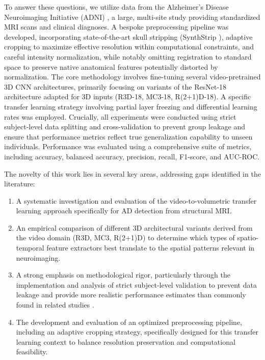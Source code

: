 \documentclass[11pt, a4paper]{article}
\begin{document}
To answer these questions, we utilize data from the Alzheimer's Disease Neuroimaging Initiative (ADNI) \cite{jack2008alzheimer}, a large, multi-site study providing standardized MRI scans and clinical diagnoses. A bespoke preprocessing pipeline was developed, incorporating state-of-the-art skull stripping (SynthStrip \cite{hoopes2022synthstrip}), adaptive cropping to maximize effective resolution within computational constraints, and careful intensity normalization, while notably omitting registration to standard space to preserve native anatomical features potentially distorted by normalization. The core methodology involves fine-tuning several video-pretrained 3D CNN architectures, primarily focusing on variants of the ResNet-18 architecture adapted for 3D inputs (R3D-18, MC3-18, R(2+1)D-18). A specific transfer learning strategy involving partial layer freezing and differential learning rates was employed. Crucially, all experiments were conducted using strict subject-level data splitting and cross-validation to prevent group leakage and ensure that performance metrics reflect true generalization capability to unseen individuals. Performance was evaluated using a comprehensive suite of metrics, including accuracy, balanced accuracy, precision, recall, F1-score, and AUC-ROC.

The novelty of this work lies in several key areas, addressing gaps identified in the literature:
\begin{enumerate}
    \item A systematic investigation and evaluation of the video-to-volumetric transfer learning approach specifically for AD detection from structural MRI.
    \item An empirical comparison of different 3D architectural variants derived from the video domain (R3D, MC3, R(2+1)D) to determine which types of spatio-temporal feature extractors best translate to the spatial patterns relevant in neuroimaging.
    \item A strong emphasis on methodological rigor, particularly through the implementation and analysis of strict subject-level validation to prevent data leakage and provide more realistic performance estimates than commonly found in related studies \cite{davatzikos2019machine}.
    \item The development and evaluation of an optimized preprocessing pipeline, including an adaptive cropping strategy, specifically designed for this transfer learning context to balance resolution preservation and computational feasibility.
\end{enumerate}
\end{document}
